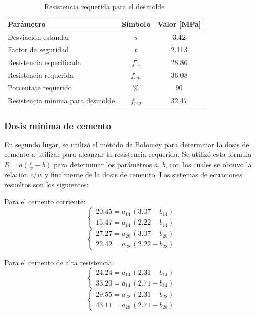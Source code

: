 \begin{table}[H]
\centering
\caption{Resistencia requerida para el desmolde}
\begin{tabular}{lcc}
\hline
Parámetro & Símbolo & Valor [MPa] \\ \hline
Desviación estándar & $s$ & 3.42 \\
Factor de seguridad & $t$ & 2.113 \\
Resistencia especificada & $f'_c$ & 28.86 \\
Resistencia requerida & $f_{cm}$ & 36.08 \\
Porcentaje requerido & \% & 90 \\
Resistencia mínima para desmolde & $f_{req}$ & 32.47 \\ \hline
\end{tabular}
\end{table}

\subsubsection{Dosis mínima de cemento}

En segundo lugar, se utilizó el método de Bolomey para determinar la dosis de cemento a utilizar para alcanzar la resistencia requerida. Se utilizó esta fórmula $R = a(\frac{c}{w} - b)$ para determinar los parámetros $a$, $b$, con los cuales se obtuvo la relación $c/w$ y finalmente de la dosis de cemento. Los sistemas de ecuaciones resueltos son los siguientes:

Para el cemento corriente:
\[
\begin{cases}
20.45 = a_{14}\,(3.07 - b_{14}) \\
15.47 = a_{14}\,(2.22 - b_{14})
\end{cases}
\]
\[
\begin{cases}
27.27 = a_{28}\,(3.07 - b_{28}) \\
22.42 = a_{28}\,(2.22 - b_{28})
\end{cases}
\]

Para el cemento de alta resistencia:
\[
\begin{cases}
24.24 = a_{14}\,(2.31 - b_{14}) \\
33.20 = a_{14}\,(2.71 - b_{14})
\end{cases}
\]
\[
\begin{cases}
29.55 = a_{28}\,(2.31 - b_{28}) \\
43.11 = a_{28}\,(2.71 - b_{28})
\end{cases}
\]


